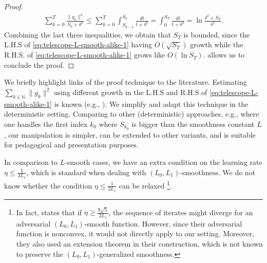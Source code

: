 \documentclass{article}
\theoremstyle{plain}
\theoremstyle{definition}
\theoremstyle{remark}
\newcommand*{\NN}{\mathbb{N}}
\begin{document}
\begin{proof}
\begin{equation*}
\end{equation*}
\begin{equation*}
    \begin{aligned}
        \sum_{k = 0}^T \frac{\|g_k\|^2}{S_k + \delta^2} \leq \sum_{k = 0}^T \int_{S_{k-1}}^{S_k} \frac{dt}{t + \delta^2} = \int_{0}^{S_T} \frac{dt}{t + \delta^2} = \ln \frac{\delta^2 + S_T}{\delta^2}.
    \end{aligned}
\end{equation*}
Combining the last three inequalities, we obtain that $S_T$ is bounded, since the L.H.S of \eqref{eq:telescope-L-smooth-alike-1} having $O(\sqrt{S_T})$ growth while the R.H.S. of \eqref{eq:telescope-L-smooth-alike-1} grows like $O(\ln S_T)$.  allows us to conclude the proof.
\end{proof}

We briefly highlight links of the proof technique to the literature.
Estimating $\sum_{k\in\NN}\|g_k\|^2$ using different growth in the L.H.S and R.H.S of \eqref{eq:telescope-L-smooth-alike-1} is known (e.g., \citet{bohan2023ada}).
We simplify and adapt this technique in the deterministic setting. Comparing to other (deterministic) approaches, e.g., \citet{rachel2019ada,traore2021sequential} where one handles the first index $k_0$ where $S_{k_0}$ is bigger than the smoothness constant $L$, our manipulation is simpler, can be extended to other variants, and is suitable for pedagogical and presentation purposes.


In comparison to $L$-smooth cases, we have an extra condition on the learning rate $\eta \leq \frac{1}{2L_1}$, which is standard when dealing with $(L_0,L_1)$-smoothness. 
We do not know whether the condition $\eta \leq \frac{1}{2L_1}$ can be relaxed \footnote{In fact, \citet[Theorem 9]{bohan2023ada} states that if $\eta \geq \frac{9\sqrt{5}}{2L_1}$, the sequence of iterates might diverge for an adversarial $(L_0,L_1)$-smooth function. However, since their adversarial function is nonconvex,
it would not directly apply to our setting. Moreover, they also used an extension theorem in their construction, which is not known to preserve the $(L_0,L_1)$-generalized smoothness.}. 
\end{document}
